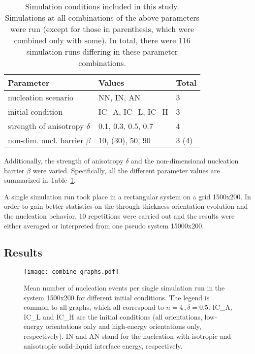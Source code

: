 \begin{table}[t]
	\begin{center}
		\begin{tabular}{lll}
			\hline
			Parameter                       & Values              & Total \\ \hline
			nucleation scenario             & NN, IN, AN          & 3     \\
			initial condition               & IC\_A, IC\_L, IC\_H & 3     \\
			strength of anisotropy $\delta$ & 0.1, 0.3, 0.5, 0.7  & 4     \\
			non-dim. nucl. barrier $\beta$  & 10, (30), 50, 90          & 3 (4)    \\ \hline
		\end{tabular}
		\caption{Simulation conditions included in this study. Simulations at all combinations of the above parameters were run (except for those in parenthesis, which were combined only with some). In total, there were 116 simulation runs differing in these parameter combinations.}
		\label{tab_sim_conditions}
	\end{center}
\end{table}

Additionally, the strength of anisotropy $\delta$ and the non-dimensional nucleation barrier $\beta$ were varied. Specifically, all the different parameter values are summarized in Table~\ref{tab_sim_conditions}.

A single simulation run took place in a rectangular system on a grid 1500x200. In order to gain better statistics on the through-thickness orientation evolution and the nucleation behavior, 10 repetitions were carried out and the results were either averaged or interpreted from one pseudo system 15000x200.

\subsection{Results}
\begin{figure*}
	\centering
	\texttt{[image: combine\_graphs.pdf]}
	\caption{Mean number of nucleation events per single simulation run in the system 1500x200 for different initial conditions. The legend is common to all graphs, which all correspond to $n=4\,,\delta=0.5$. IC\_A, IC\_L and IC\_H are the initial conditions (all orientations, low-energy orientations only and high-energy orientations only, respectively). IN and AN stand for the nucleation with isotropic and anisotropic solid-liquid interface energy, respectively.}
	\label{fig_MC_mean_events}
\end{figure*}

